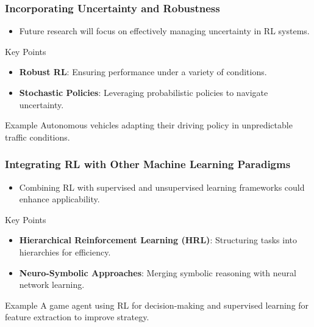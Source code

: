 \documentclass{beamer}
\begin{document}
\begin{frame}[fragile]
    \frametitle{Incorporating Uncertainty and Robustness}
    \begin{itemize}
        \item Future research will focus on effectively managing uncertainty in RL systems.
    \end{itemize}
    \begin{block}{Key Points}
        \begin{itemize}
            \item \textbf{Robust RL}: Ensuring performance under a variety of conditions.
            \item \textbf{Stochastic Policies}: Leveraging probabilistic policies to navigate uncertainty.
        \end{itemize}
    \end{block}
    \begin{block}{Example}
        Autonomous vehicles adapting their driving policy in unpredictable traffic conditions.
    \end{block}
\end{frame}

\begin{frame}[fragile]
    \frametitle{Integrating RL with Other Machine Learning Paradigms}
    \begin{itemize}
        \item Combining RL with supervised and unsupervised learning frameworks could enhance applicability.
    \end{itemize}
    \begin{block}{Key Points}
        \begin{itemize}
            \item \textbf{Hierarchical Reinforcement Learning (HRL)}: Structuring tasks into hierarchies for efficiency.
            \item \textbf{Neuro-Symbolic Approaches}: Merging symbolic reasoning with neural network learning.
        \end{itemize}
    \end{block}
    \begin{block}{Example}
        A game agent using RL for decision-making and supervised learning for feature extraction to improve strategy.
    \end{block}
\end{frame}
\end{document}

